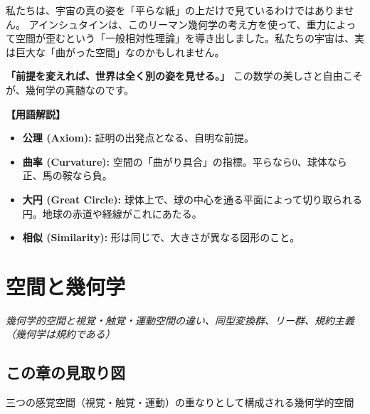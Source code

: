 \documentclass[a4paper,11pt,openany]{ltjsbook}
\begin{document}
\begin{lecturebox}
私たちは、宇宙の真の姿を「平らな紙」の上だけで見ているわけではありません。
アインシュタインは、このリーマン幾何学の考え方を使って、重力によって空間が歪むという「一般相対性理論」を導き出しました。私たちの宇宙は、実は巨大な「曲がった空間」なのかもしれません。

\textbf{「前提を変えれば、世界は全く別の姿を見せる。」}
この数学の美しさと自由こそが、幾何学の真髄なのです。

\textbf{【用語解説】}
\begin{itemize}[leftmargin=2em]
\item \textbf{公理 (Axiom):} 証明の出発点となる、自明な前提。
\item \textbf{曲率 (Curvature):} 空間の「曲がり具合」の指標。平らなら0、球体なら正、馬の鞍なら負。
\item \textbf{大円 (Great Circle):} 球体上で、球の中心を通る平面によって切り取られる円。地球の赤道や経線がこれにあたる。
\item \textbf{相似 (Similarity):} 形は同じで、大きさが異なる図形のこと。
\end{itemize}
\end{lecturebox}


\clearpage
\chapter{空間と幾何学}
\begin{center}\large\textit{幾何学的空間と視覚・触覚・運動空間の違い、同型変換群、リー群、規約主義（幾何学は規約である）}\end{center}

\section*{この章の見取り図}
\begin{center}


\small 三つの感覚空間（視覚・触覚・運動）の重なりとして構成される幾何学的空間
\end{center}
\end{document}
